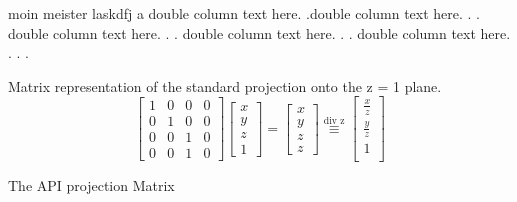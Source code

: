 \documentclass[conference]{IEEEtran}
\begin{document}
\begin{multicols}{2}

moin meister laskdfj a    double column text here. .double column text here. . .
    double column text here. . .
    double column text here. . .
    double column text here. . .
    .

\end{multicols}

Matrix representation of the standard projection onto the z = 1 plane.
\begin{equation}
    \begin{bmatrix}
        1 & 0 & 0 & 0 \\
        0 & 1 & 0 & 0 \\
        0 & 0 & 1 & 0 \\
        0 & 0 & 1 & 0
    \end{bmatrix}
    \begin{bmatrix}
        x \\
        y \\
        z \\
        1
    \end{bmatrix}
    =
    \begin{bmatrix}
        x \\
        y \\
        z \\
        z
    \end{bmatrix}
    \overset{\text{div z}}{\equiv}
    \begin{bmatrix}
        \frac{x}{z} \\
        \frac{y}{z} \\
        1           \\
    \end{bmatrix}
\end{equation}

The API projection Matrix
\end{document}
